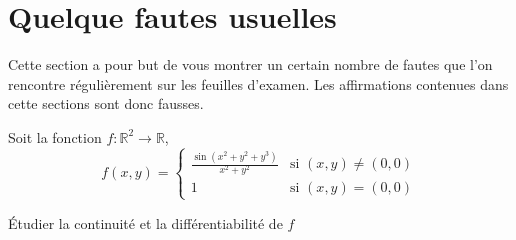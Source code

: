
\section{Quelque fautes usuelles}

Cette section a pour but de vous montrer un certain nombre de fautes que l'on rencontre régulièrement sur les feuilles d'examen. Les affirmations contenues dans cette sections sont donc fausses.

\begin{exercice}
Soit la fonction $f : \mathbb{R}^2\to \mathbb{R}$,
\begin{equation}
	f(x,y)=\begin{cases}
		\frac{ \sin(x^2+y^2+y^3) }{ x^2+y^2 }	&	\text{si $(x,y)\neq (0,0)$}\\
			1				&	 \text{si $(x,y)=(0,0)$}
	\end{cases}
\end{equation}

Étudier la continuité et la différentiabilité de $f$
\end{exercice}

